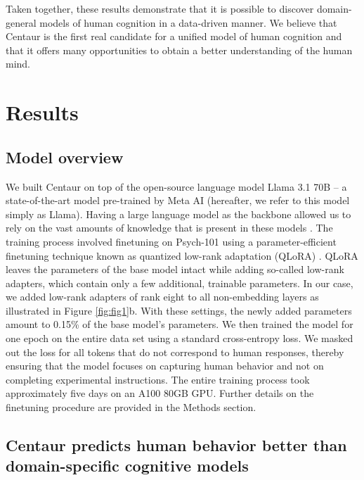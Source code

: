 \documentclass[pdflatex,sn-nature]{sn-jnl}%
\theoremstyle{thmstyleone}%
\theoremstyle{thmstyletwo}%
\theoremstyle{thmstylethree}%
\begin{document}
Taken together, these results demonstrate that it is possible to discover domain-general models of human cognition in a data-driven manner. We believe that Centaur is the first real candidate for a unified model of human cognition and that it offers many opportunities to obtain a better understanding of the human mind.

\section*{Results}\label{sec2}

\subsection*{Model overview}

We built Centaur on top of the open-source language model Llama 3.1 70B -- a state-of-the-art model pre-trained by Meta AI \cite{dubey2024llama} (hereafter, we refer to this model simply as Llama). Having a large language model as the backbone allowed us to rely on the vast amounts of knowledge that is present in these models \cite{petroni-etal-2019-language}. The training process involved finetuning on Psych-101 using a parameter-efficient finetuning technique known as quantized low-rank adaptation (QLoRA) \cite{dettmers2024qlora}. QLoRA leaves the parameters of the base model intact while adding so-called low-rank adapters, which contain only a few additional, trainable parameters. In our case, we added low-rank adapters of rank eight to all non-embedding layers as illustrated in Figure \ref{fig:fig1}b. With these settings, the newly added parameters amount to 0.15\% of the base model's parameters. We then trained the model for one epoch on the entire data set using a standard cross-entropy loss. We masked out the loss for all tokens that do not correspond to human responses, thereby ensuring that the model focuses on capturing human behavior and not on completing experimental instructions. The entire training process took approximately five days on an A100 80GB GPU. Further details on the finetuning procedure are provided in the Methods section.

\subsection*{Centaur predicts human behavior better than domain-specific cognitive models}\label{sec3}
\end{document}
